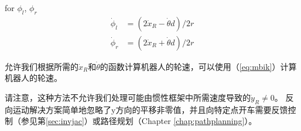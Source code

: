 for $ \phi_l$, $ \phi_r$
\begin{eqnarray}
\dot{\phi}_l &= (2\dot{x}_R - \dot{\theta}d)/2r\\
\nonumber
\dot{\phi}_r &= (2\dot{x}_R + \dot{\theta}d)/2r
\end{eqnarray}



允许我们根据所需的$ \dot {x}_R $和$ \dot {\theta} $的函数计算机器人的轮速，可以使用（\ref{eq:mbik}）计算机器人的轮速。

请注意，这种方法不允许我们处理可能由惯性框架中所需速度导致的$ \dot{y}_R\neq 0 $。 反向运动解决方案简单地忽略了y方向的平移非零值，并且向特定点开车需要反馈控制（参见第\ref {sec:invjac}）或路径规划（Chapter \ref {chap:pathplanning}）。



